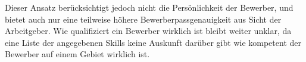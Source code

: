 Dieser Ansatz berücksichtigt jedoch nicht die Persönlichkeit der Bewerber, und bietet auch nur eine teilweise höhere Bewerberpassgenauigkeit aus Sicht der Arbeitgeber. Wie qualifiziert ein Bewerber wirklich ist bleibt weiter unklar, da eine Liste der angegebenen Skills keine Auskunft darüber gibt wie kompetent der Bewerber auf einem Gebiet wirklich ist. 




